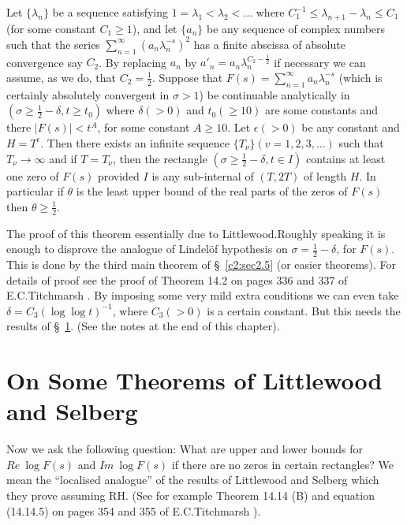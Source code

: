 \begin{theorem}\label{c5:thm5.2.2}
Let $\{\lambda_{n}\}$ be a sequence satisfying
$1=\lambda_{1}<\lambda_{2}<\ldots$ where $C^{-1}_{1}\leq
\lambda_{n+1}-\lambda_{n}\leq C_{1}$ (for some constant $C_{1}\geq
1$), and let $\{a_{n}\}$ be any sequence of complex numbers such that
the series $\sum\limits^{\infty}_{n=1}(a_{n}\lambda^{-s}_{n})^{2}$ has
a finite abscissa of absolute convergence say $C_{2}$. By replacing
$a_{n}$ by $a'_{n}=a_{n}\lambda^{C_{2}-\frac{1}{2}}_{n}$ if necessary
we can assume, as we do, that $C_{2}=\frac{1}{2}$. Suppose that
$F(s)=\sum\limits^{\infty}_{n=1}a_{n}\lambda^{-s}_{n}$ (which is
certainly absolutely convergent in $\sigma>1$) be continuable
analytically in $(\sigma\geq \frac{1}{2}-\delta,t\geq t_{0})$ where
$\delta(>0)$ and $t_{0}(\geq 10)$ are some constants and there
$|F(s)|<t^{A}$, for some constant $A\geq 10$. Let $\epsilon(>0)$ be
any constant and $H=T^{\epsilon}$. Then there exists an infinite
sequence $\{T_{\nu}\}(v=1,2,3,\ldots)$ such that $T_{\nu}\to \infty$
and if $T=T_{\nu}$, then the rectangle $(\sigma\geq
\frac{1}{2}-\delta,t\in I)$ contains at least one zero of $F(s)$
provided $I$ is any sub-internal of $(T,2T)$ of length $H$. In
particular if $\theta$ is the least upper bound of the real parts of
the zeros of $F(s)$ then $\theta\geq \frac{1}{2}$. 
\end{theorem}

\begin{remark*}
The proof of this theorem essentially due to Littlewood.\break Roughly
speaking it is enough to disprove the analogue of Lindel\"of
hypothesis on $\sigma=\frac{1}{2}-\delta$, for $F(s)$. This is done by
the third main theorem of \S\ \ref{c2:sec2.5} (or easier
theorems). For details of proof see the proof of Theorem 14.2 on pages
336 and 337 of E.C.\@ Titchmarsh \cite{Titchmarsh1}. By imposing some very
mild extra conditions we can even take $\delta=C_{3}(\log\log
t)^{-1}$, where $C_{3}(>0)$ is a certain constant. But this needs the
results of \S\ \ref{c5:sec5.3}. (See the notes at the end of this
chapter). 
\end{remark*}

\section{On Some Theorems of Littlewood and
  Selberg}\label{c5:sec5.3}

Now we ask the following question: What are upper and lower bounds for
$Re\ \log F(s)$ and $Im\ \log F(s)$ if there are no zeros in certain
rectangles? We mean the ``localised analogue'' of the results of
Littlewood and Selberg which they prove assuming RH. (See for example
Theorem 14.14 (B) and equation (14.14.5) on pages 354 and 355 of
E.C.\@ Titchmarsh \cite{Titchmarsh1}). 

